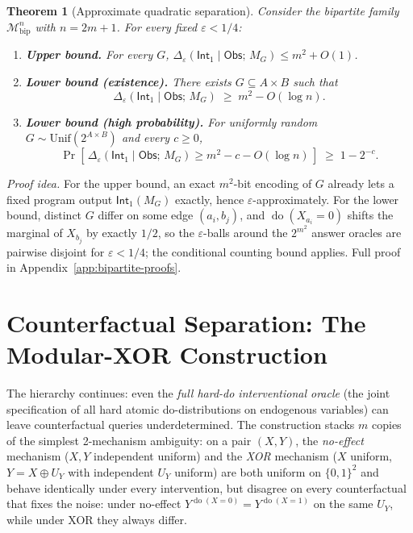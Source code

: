 \documentclass{article}
\theoremstyle{plain}
\newtheorem{theorem}{Theorem}[section]
\theoremstyle{definition}
\newcommand{\calM}{\mathcal{M}}
\newcommand{\Obs}{\mathsf{Obs}}
\newcommand{\Int}{\mathsf{Int}}
\DeclareMathOperator{\doop}{do}
\begin{document}
\begin{theorem}[Approximate quadratic separation]
\label{thm:approx-quadratic}
Consider the bipartite family $\calM_{\mathrm{bip}}^n$ with $n = 2m + 1$. For every fixed $\varepsilon < 1/4$:
\begin{enumerate}
    \item \textbf{Upper bound.} For every $G$, $\Delta_\varepsilon(\Int_1 \mid \Obs;\, M_G) \leq m^2 + O(1)$.
    \item \textbf{Lower bound (existence).} There exists $G \subseteq A \times B$ such that
    \[
        \Delta_\varepsilon(\Int_1 \mid \Obs;\, M_G) \;\geq\; m^2 - O(\log n).
    \]
    \item \textbf{Lower bound (high probability).} For uniformly random $G \sim \mathrm{Unif}(2^{A \times B})$ and every $c \geq 0$,
    \[
        \Pr\!\left[\, \Delta_\varepsilon(\Int_1 \mid \Obs;\, M_G) \geq m^2 - c - O(\log n) \,\right] \;\geq\; 1 - 2^{-c}.
    \]
\end{enumerate}
\end{theorem}

\emph{Proof idea.} For the upper bound, an exact $m^2$-bit encoding of $G$ already lets a fixed program output $\Int_1(M_G)$ exactly, hence $\varepsilon$-approximately. For the lower bound, distinct $G$ differ on some edge $(a_i, b_j)$, and $\doop(X_{a_i}{=}0)$ shifts the marginal of $X_{b_j}$ by exactly $1/2$, so the $\varepsilon$-balls around the $2^{m^2}$ answer oracles are pairwise disjoint for $\varepsilon < 1/4$; the conditional counting bound applies. Full proof in Appendix~\ref{app:bipartite-proofs}.

\section{Counterfactual Separation: The Modular-XOR Construction}
\label{sec:counterfactual}


The hierarchy continues: even the \emph{full hard-do interventional oracle} (the joint specification of all hard atomic do-distributions on endogenous variables) can leave counterfactual queries underdetermined. The construction stacks $m$ copies of the simplest 2-mechanism ambiguity: on a pair $(X, Y)$, the \emph{no-effect} mechanism ($X, Y$ independent uniform) and the \emph{XOR} mechanism ($X$ uniform, $Y = X \oplus U_Y$ with independent $U_Y$ uniform) are both uniform on $\{0,1\}^2$ and behave identically under every intervention, but disagree on every counterfactual that fixes the noise: under no-effect $Y^{\doop(X=0)} = Y^{\doop(X=1)}$ on the same $U_Y$, while under XOR they always differ.
\end{document}
